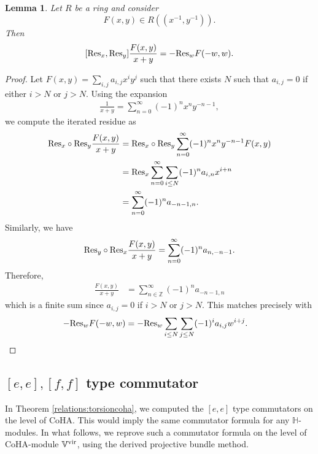 \documentclass[10pt]{amsart}
\newcommand{\BZ}{\mathbb{Z}}
\newcommand{\BH}{\mathbb{H}}
\newcommand{\BV}{\mathbb{V}}
\newcommand{\+}{{}^+}
\newcommand{\vir}{\textnormal{vir}}
\newcommand{\Res}{\textnormal{Res}}
\newtheorem {lemma}[theorem]{Lemma}
\theoremstyle{definition}
\theoremstyle {definition}
\theoremstyle {definition}
\begin{document}
\begin{lemma}\label{lem: commutator for the residue}
Let $R$ be a ring and consider 
$$F(x,y)\in R(\!(x^{-1},y^{-1})\!). 
$$
Then 
$$[\Res_{x},\Res_{y}]\frac{F(x,y)}{x+y}=- \Res_w F(-w,w).
$$
\end{lemma}
\begin{proof}
    Let $F(x,y)=\sum_{i,j}a_{i,j}x^iy^j$ such that there exists $N$ such that $a_{i,j}=0$ if either $i>N$ or $j>N$. Using the expansion 
    \begin{align*}
        \frac{1}{x+y}=\sum_{n=0}^\infty (-1)^n x^{n}y^{-n-1},
    \end{align*}
 we compute the iterated residue as
 \begin{align*}
     \Res_x\circ  \Res_y\frac{F(x,y)}{x+y}
     &=\Res_x \circ \Res_y \sum_{n=0}^\infty (-1)^n x^{n}y^{-n-1} F(x,y)\\ 
     &=\Res_x \sum_{n=0}^\infty\sum_{i\leq N} (-1)^n a_{i,n} x^{i+n}\\
     &=\sum_{n=0}^\infty (-1)^n a_{-n-1, n}. 
 \end{align*}
Similarly, we have
$$\Res_y\circ  \Res_x\frac{F(x,y)}{x+y}=\sum_{n=0}^\infty (-1)^n a_{n, -n-1}. 
$$
Therefore, 
\begin{align*}
    [\Res_x,\Res_y]\frac{F(x,y)}{x+y}
    &=\sum_{n\in\BZ}^\infty (-1)^n a_{-n-1, n}
\end{align*}
which is a finite sum since $a_{i,j}=0$ if $i>N$ or $j>N$. This matches precisely with 
\begin{align*}
    - \Res_w F(-w,w)&=- \Res_w\sum_{i\leq N} \sum_{j\leq N}(-1)^i a_{i,j} w^{i+j}.
\end{align*}

\end{proof}

\subsection{$[e,e], [f,f]$ type commutator}

In Theorem \ref{relations:torsioncoha}, we computed the $[e,e]$ type commutators on the level of CoHA. This would imply the same commutator formula for any $\BH$-modules. In what follows, we reprove such a commutator formula on the level of CoHA-module $\BV^\vir$, using the derived projective bundle method. 
\end{document}
